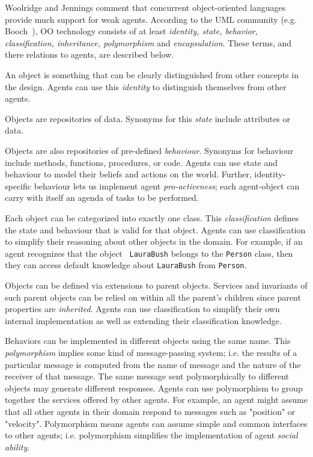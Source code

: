 Woolridge and Jennings comment that concurrent object-oriented languages
provide much support for weak agents.   According to the UML community (e.g.
Booch~\cite{booch94}), OO technology consists of at least {\em identity, state,
behavior, classification, inheritance, polymorphism} and {\em encapsulation}.
These terms, and there relations to agents, are described below.

 An object is
something that can be clearly distinguished from other concepts in the design.
Agents can use this {\em identity} to distinguish themselves from other agents.

 Objects are repositories of  data. Synonyms for
this {\em state} include attributes or data.

 Objects are also
repositories of  pre-defined {\em behaviour}. Synonyms for behaviour include
methods, functions, procedures, or code. Agents can use state and behaviour to
model their beliefs and actions on the world. Further, identity-specific
behaviour lets us implement agent {\em pro-activeness}; each agent-object can
carry with itself an agenda of tasks to be performed.

Each object can be categorized into exactly one class. This {\em
classification} defines the state and behaviour that is valid for that object.
Agents can use classification to simplify  their reasoning about other objects
in the domain. For example, if an agent recognizes that the object {\tt
LauraBush} belongs to the {\tt Person} class, then they can access default
knowledge about {\tt LauraBush} from {\tt Person}.

Objects can be defined via extensions to parent objects. Services and
invariants of such parent objects can be relied on within all the parent's
children since parent properties are {\em inherited}. Agents can use
classification to simplify their own internal implementation as well as
extending their classification knowledge.

 Behaviors can
be implemented in different objects using the same name. This {\em
polymorphism} implies some kind of message-passing system; i.e. the results of
a particular message is computed from the name of message and the nature of the
receiver of that message. The same message sent polymorphically to different
objects may generate different responses. Agents can use polymorphism to  group
together the services offered by other agents. For example, an agent might
assume that all other agents in their domain respond to messages such as
"position" or "velocity". Polymorphism means agents can assume simple and
common interfaces to other agents; i.e. polymorphism simplifies the
implementation of  agent {\em social ability}.

